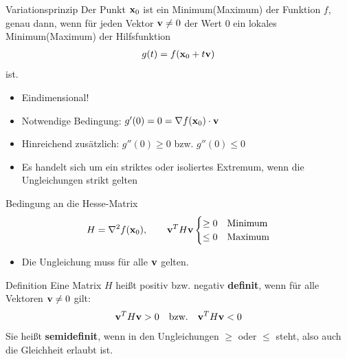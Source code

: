 \begin{frame}
  \begin{block}{Variationsprinzip}
    Der Punkt $\mathbf{x}_0$ ist ein Minimum(Maximum) der Funktion $f$, genau
    dann, wenn für jeden Vektor $\mathbf{v}\neq 0$ der Wert 0 ein lokales
    Minimum(Maximum) der Hilfsfunktion
    \begin{gather*}
      g(t) = f(\mathbf{x}_0+t\mathbf{v})
    \end{gather*}
    ist.
  \end{block}
  \begin{itemize}
  \item Eindimensional!
  \item Notwendige Bedingung: $g'(0)=0=\nabla f(\mathbf{x}_0)\cdot \mathbf{v}$
  \item Hinreichend zusätzlich: $g''(0) \ge 0$ bzw. $g''(0) \le 0$
  \item Es handelt sich um ein striktes oder isoliertes Extremum, wenn
    die Ungleichungen strikt gelten
  \end{itemize}
\end{frame}

\begin{frame}{Bedingung an die Hesse-Matrix}
  \begin{gather*}
    H = \nabla^2 f(\mathbf{x}_0),\qquad
    \mathbf{v}^TH\mathbf{v}
    \begin{cases}
      \ge 0 & \text{Minimum}\\
      \le 0 & \text{Maximum}
    \end{cases}
  \end{gather*}
  \begin{itemize}
  \item Die Ungleichung muss für alle $\mathbf{v}$ gelten.
  \end{itemize}
  \begin{block}{Definition}
    Eine Matrix $H$ heißt positiv bzw. negativ \textbf{definit}, wenn für alle Vektoren $\mathbf{v}\neq 0$ gilt:
    \begin{gather*}
      \mathbf{v}^T H \mathbf{v} > 0
      \quad\text{bzw.}\quad
      \mathbf{v}^T H \mathbf{v} < 0
    \end{gather*}
    Sie heißt \textbf{semidefinit}, wenn in den Ungleichungen $\ge$ oder $\le$
    steht, also auch die Gleichheit erlaubt ist.
  \end{block}
\end{frame}

